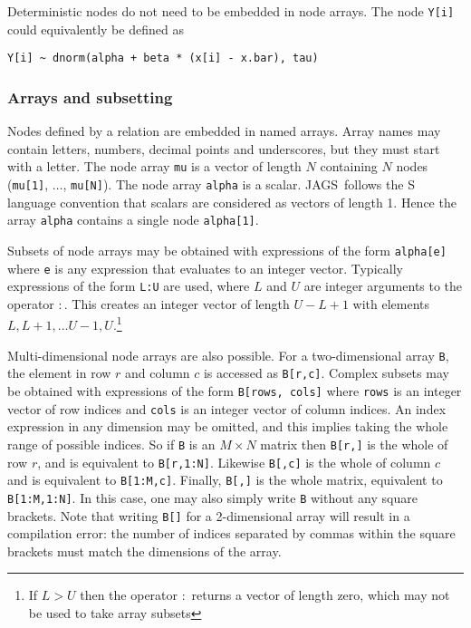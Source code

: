 \documentclass[11pt, a4paper, titlepage]{report}
\newcommand{\JAGS}{\textsf{JAGS}}
\begin{document}
Deterministic nodes do not need to be embedded in node arrays. The
node \verb+Y[i]+ could equivalently be defined as
\begin{verbatim}
Y[i] ~ dnorm(alpha + beta * (x[i] - x.bar), tau)
\end{verbatim}

\subsubsection{Arrays and subsetting}

Nodes defined by a relation are embedded in named arrays. Array names may
contain letters, numbers, decimal points and underscores, but they must
start with a letter.  The node array \verb+mu+ is a vector of length
$N$ containing $N$ nodes (\verb+mu[1]+, $\ldots$, \verb+mu[N]+). The
node array \verb+alpha+ is a scalar.  \JAGS\ follows the S language
convention that scalars are considered as vectors of length 1. Hence
the array \verb+alpha+ contains a single node \verb+alpha[1]+.

Subsets of node arrays may be obtained with expressions of the form
\verb+alpha[e]+ where \verb+e+ is any expression that evaluates to an
integer vector. Typically expressions of the form \verb+L:U+ are used,
where $L$ and $U$ are integer arguments to the operator $:$. This
creates an integer vector of length $U - L + 1$ with elements $L, L+1,
\ldots U-1, U$.\footnote{If $L > U$ then the operator $:$ returns a
vector of length zero, which may not be used to take array subsets}

Multi-dimensional node arrays are also possible. For a two-dimensional
array \verb+B+, the element in row $r$ and column $c$ is accessed as
\verb+B[r,c]+. Complex subsets may be obtained with expressions of the
form \verb+B[rows, cols]+ where \verb+rows+ is an integer vector of
row indices and \verb+cols+ is an integer vector of column indices.
An index expression in any dimension may be omitted, and this implies
taking the whole range of possible indices. So if \verb+B+ is an
$M \times N$ matrix then \verb+B[r,]+ is the whole of row $r$, and is
equivalent to \verb+B[r,1:N]+. Likewise \verb+B[,c]+ is the whole of
column $c$ and is equivalent to \verb+B[1:M,c]+. Finally, \verb+B[,]+
is the whole matrix, equivalent to \verb+B[1:M,1:N]+. In this case,
one may also simply write \verb+B+ without any square brackets. Note
that writing \verb+B[]+ for a 2-dimensional array will result in a
compilation error: the number of indices separated by commas within
the square brackets must match the dimensions of the array.
\end{document}
